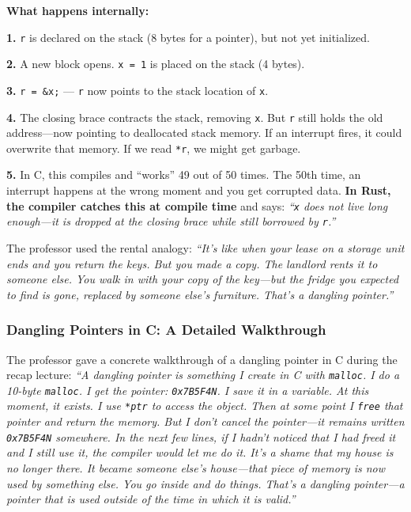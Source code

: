 \begin{memoryblock}
\textbf{What happens internally:}

\textbf{1.} \texttt{r} is declared on the stack (8 bytes for a pointer), but not yet initialized.

\textbf{2.} A new block opens. \texttt{x = 1} is placed on the stack (4 bytes).

\textbf{3.} \texttt{r = \&x;} --- \texttt{r} now points to the stack location of \texttt{x}.

\textbf{4.} The closing brace contracts the stack, removing \texttt{x}. But \texttt{r} still holds the old address---now pointing to deallocated stack memory. If an interrupt fires, it could overwrite that memory. If we read \texttt{*r}, we might get garbage.

\textbf{5.} In C, this compiles and ``works'' 49 out of 50 times. The 50th time, an interrupt happens at the wrong moment and you get corrupted data. \textbf{In Rust, the compiler catches this at compile time} and says: \emph{``\texttt{x} does not live long enough---it is dropped at the closing brace while still borrowed by \texttt{r}.''}
\end{memoryblock}

The professor used the rental analogy: \emph{``It's like when your lease on a storage unit ends and you return the keys. But you made a copy. The landlord rents it to someone else. You walk in with your copy of the key---but the fridge you expected to find is gone, replaced by someone else's furniture. That's a dangling pointer.''}

\subsubsection{Dangling Pointers in C: A Detailed Walkthrough}

The professor gave a concrete walkthrough of a dangling pointer in C during the recap lecture: \emph{``A dangling pointer is something I create in C with \texttt{malloc}. I do a 10-byte \texttt{malloc}. I get the pointer: \texttt{0x7B5F4N}. I save it in a variable. At this moment, it exists. I use \texttt{*ptr} to access the object. Then at some point I \texttt{free} that pointer and return the memory. But I don't cancel the pointer---it remains written \texttt{0x7B5F4N} somewhere. In the next few lines, if I hadn't noticed that I had freed it and I still use it, the compiler would let me do it. It's a shame that my house is no longer there. It became someone else's house---that piece of memory is now used by something else. You go inside and do things. That's a dangling pointer---a pointer that is used outside of the time in which it is valid.''}

